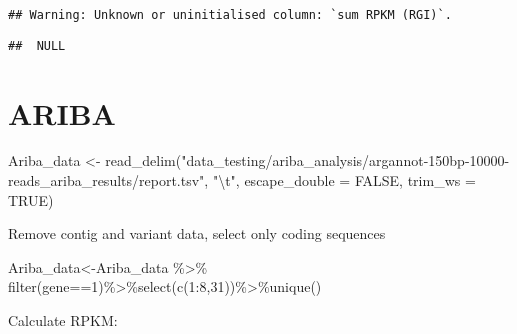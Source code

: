\documentclass[
]{article}
\newenvironment{Shaded}{\begin{snugshade}}{\end{snugshade}}
\newcommand{\AttributeTok}[1]{\textcolor[rgb]{0.77,0.63,0.00}{#1}}
\newcommand{\ConstantTok}[1]{\textcolor[rgb]{0.00,0.00,0.00}{#1}}
\newcommand{\DecValTok}[1]{\textcolor[rgb]{0.00,0.00,0.81}{#1}}
\newcommand{\FunctionTok}[1]{\textcolor[rgb]{0.00,0.00,0.00}{#1}}
\newcommand{\NormalTok}[1]{#1}
\newcommand{\OtherTok}[1]{\textcolor[rgb]{0.56,0.35,0.01}{#1}}
\newcommand{\SpecialCharTok}[1]{\textcolor[rgb]{0.00,0.00,0.00}{#1}}
\newcommand{\StringTok}[1]{\textcolor[rgb]{0.31,0.60,0.02}{#1}}
\begin{document}
\begin{Shaded}
\end{Shaded}

\begin{verbatim}
## Warning: Unknown or uninitialised column: `sum RPKM (RGI)`.
\end{verbatim}

\begin{verbatim}
##  NULL
\end{verbatim}

\hypertarget{ariba}{%
\section{ARIBA}\label{ariba}}

\begin{Shaded}
\begin{Highlighting}[]
\NormalTok{Ariba\_data }\OtherTok{\textless{}{-}} \FunctionTok{read\_delim}\NormalTok{(}\StringTok{"data\_testing/ariba\_analysis/argannot{-}150bp{-}10000{-}reads\_ariba\_results/report.tsv"}\NormalTok{, }
    \StringTok{"}\SpecialCharTok{\textbackslash{}t}\StringTok{"}\NormalTok{, }\AttributeTok{escape\_double =} \ConstantTok{FALSE}\NormalTok{, }\AttributeTok{trim\_ws =} \ConstantTok{TRUE}\NormalTok{)}
\end{Highlighting}
\end{Shaded}

Remove contig and variant data, select only coding sequences

\begin{Shaded}
\begin{Highlighting}[]
\NormalTok{Ariba\_data}\OtherTok{\textless{}{-}}\NormalTok{Ariba\_data }\SpecialCharTok{\%\textgreater{}\%} \FunctionTok{filter}\NormalTok{(gene}\SpecialCharTok{==}\DecValTok{1}\NormalTok{)}\SpecialCharTok{\%\textgreater{}\%}\FunctionTok{select}\NormalTok{(}\FunctionTok{c}\NormalTok{(}\DecValTok{1}\SpecialCharTok{:}\DecValTok{8}\NormalTok{,}\DecValTok{31}\NormalTok{))}\SpecialCharTok{\%\textgreater{}\%}\FunctionTok{unique}\NormalTok{()}
\end{Highlighting}
\end{Shaded}

Calculate RPKM:
\end{document}
